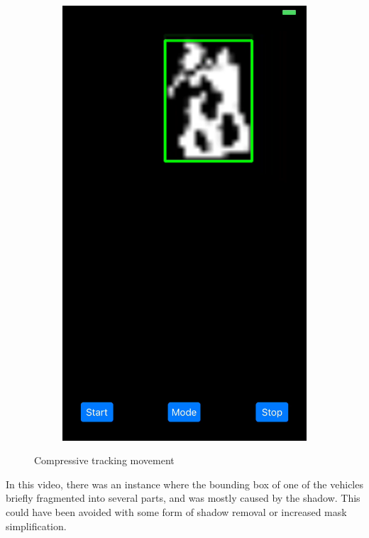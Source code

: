\documentclass[11pt,letterpaper]{article}
\begin{document}
\begin{figure}[h!]
\begin{subfigure}{.4\textwidth}
		\end{subfigure}\space\space\space\space%
		\begin{subfigure}{.4\textwidth}
			\centering
			\includegraphics[width=1\linewidth]{mode3b}
		\end{subfigure}
		\caption{Compressive tracking movement}
	\end{figure}

    In this video, there was an instance where the bounding box of one of the vehicles briefly fragmented into several parts, and was mostly caused by the shadow. This could have been avoided with some form of shadow removal or increased mask simplification.
\end{document}
